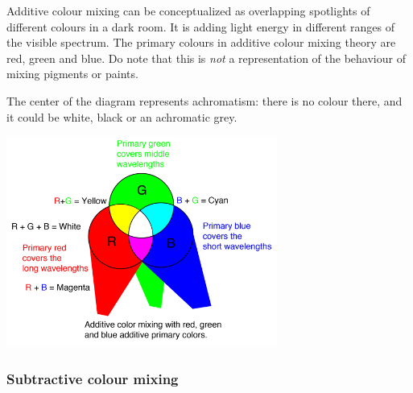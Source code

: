 \documentclass[12pt]{article}
\begin{document}
\begin{multicols}{2}

Additive colour mixing can be conceptualized as overlapping spotlights of different colours in a dark room.
It is adding light energy in different ranges of the visible spectrum.
The primary colours in additive colour mixing theory are red, green and blue.
Do note that this is \emph{not} a representation of the behaviour of mixing pigments or paints.

The center of the diagram represents achromatism: there is no colour there, and it could be white, black or an achromatic grey.

\columnbreak

\begin{center}
\includegraphics[width=3.5in]{additive_colour_mixing}
\end{center}



\end{multicols}

\subsubsection{Subtractive colour mixing}
\end{document}
